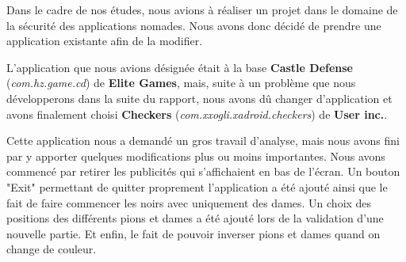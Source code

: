 Dans le cadre de nos études, nous avions à réaliser un projet dans le domaine de la sécurité des applications nomades.
Nous avons donc décidé de prendre une application existante afin de la modifier.

L'application que nous avions désignée était à la base \textbf{Castle Defense} (\textit{com.hz.game.cd}) de \textbf{Elite Games},
mais, suite à un problème que nous développerons dans la suite du rapport,
nous avons dû changer d'application et avons finalement choisi \textbf{Checkers}
(\textit{com.xxogli.xadroid.checkers}) de \textbf{User inc.}.

Cette application nous a demandé un gros travail d'analyse,
mais nous avons fini par y apporter quelques modifications plus ou moins importantes.
Nous avons commencé par retirer les publicités qui s'affichaient en bas de l'écran.
Un bouton "Exit" permettant de quitter proprement l'application a été ajouté
ainsi que le fait de faire commencer les noirs avec uniquement des dames.
Un choix des positions des différents pions et dames a été ajouté lors de la validation d'une nouvelle partie.
Et enfin, le fait de pouvoir inverser pions et dames quand on change de couleur.
